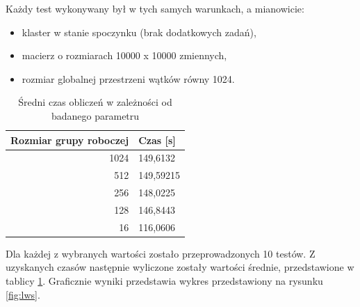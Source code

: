 \documentclass[12pt,a4paper,twoside]{article}
\begin{document}
Każdy test wykonywany był w tych samych warunkach, a mianowicie: 

\begin{itemize}
\item klaster w stanie spoczynku (brak dodatkowych zadań),
\item macierz o rozmiarach 10000 x 10000 zmiennych,
\item rozmiar globalnej przestrzeni wątków równy 1024.
\end{itemize}

\begin{table}
\begin{center}
\begin{tabular}{|r|l|}
\hline
Rozmiar grupy roboczej & Czas [s] \\
\hline
1024 & 149,6132 \\ 
512	& 149,59215 \\
256	& 148,0225 \\
128	& 146,8443 \\ 
16	& 116,0606 \\
\hline
\end{tabular}
\end{center}
\caption{Średni czas obliczeń w zależności od badanego parametru}
\label{tab:time}
\end{table}

Dla każdej z wybranych wartości zostało przeprowadzonych 10 testów. Z uzyskanych czasów następnie wyliczone zostały wartości średnie, przedstawione w tablicy \ref{tab:time}. Graficznie wyniki przedstawia wykres przedstawiony na rysunku \ref{fig:lws}.
\end{document}
